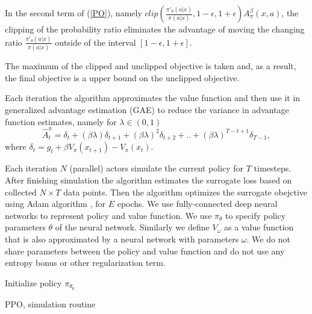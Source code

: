 \documentclass[11pt]{article}
\theoremstyle{definition}
\numberwithin{equation}{section}
\begin{document}
In the second term of (\ref{PO}), namely $clip\left(\frac{\pi'_\theta(a| x)}{\pi(a|x)}, 1-\epsilon, 1+\epsilon  \right)  A^\beta_{\pi}(x, a)$, the clipping of the probability ratio eliminates the advantage of moving the changing ratio $\frac{\pi'_\theta(a| x)}{\pi(a|x)}$ outside of the interval $[1-\epsilon, 1+\epsilon]$.

The maximum of the clipped and unclipped objective is taken and, as a result,  the
final objective is a upper bound on the unclipped objective.





Each iteration  the algorithm approximates the value function and then use it in generalized advantage estimation (GAE) \cite{Schulman2016}  to reduce the variance in advantage function estimates, namely for $\lambda\in (0, 1)$
\begin{equation}
\hat A_t^\pi = \delta_t+(\beta\lambda)\delta_{t+1}+(\beta\lambda)^2\delta_{t+2}+..+(\beta\lambda)^{T-t+1}\delta_{T-1},
\end{equation}
where $\delta_t = g_t+\beta V_\pi(x_{t+1}) - V_\pi(x_t).$

 Each iteration $N$ (parallel) actors simulate the current policy for $T$ timesteps. After finishing simulation the algorithm estimates the surrogate loss based on collected  $N\times T$ data points. Then the algorithm  optimizes the surrogate obejctive using Adam algorithm \cite{Kingma2017}, for $E$ epochs. We use fully-connected deep neural networks to represent policy and value function. We use $\pi_\theta$ to specify policy parameters $\theta$ of the neural network. Similarly we define $V_\omega$ as a value function that is also approximated by a neural network with parameters $\omega$.
We do not share parameters between the policy and value function and do not use any entropy bonus or other regularization term.






\begin{algorithm}[H]
\SetAlgoLined
{}
 Initialize policy $\pi_{\theta_0}$\;

 \caption{PPO, simulation routine}\label{alg}
\end{algorithm}
\end{document}
